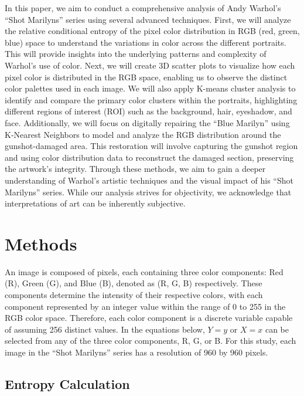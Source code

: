 \documentclass{article}
\begin{document}
In this paper, we aim to conduct a comprehensive analysis of Andy
Warhol's ``Shot Marilyns'' series using several advanced techniques.
First, we will analyze the relative conditional entropy of the pixel
color distribution in RGB (red, green, blue) space to understand the
variations in color across the different portraits. This will provide
insights into the underlying patterns and complexity of Warhol's use of
color. Next, we will create 3D scatter plots to visualize how each pixel
color is distributed in the RGB space, enabling us to observe the
distinct color palettes used in each image. We will also apply K-means
cluster analysis to identify and compare the primary color clusters
within the portraits, highlighting different regions of interest (ROI)
such as the background, hair, eyeshadow, and face. Additionally, we will
focus on digitally repairing the ``Blue Marilyn'' using K-Nearest
Neighbors to model and analyze the RGB distribution around the
gunshot-damaged area. This restoration will involve capturing the
gunshot region and using color distribution data to reconstruct the
damaged section, preserving the artwork's integrity. Through these
methods, we aim to gain a deeper understanding of Warhol's artistic
techniques and the visual impact of his ``Shot Marilyns'' series. While
our analysis strives for objectivity, we acknowledge that
interpretations of art can be inherently subjective.

\hypertarget{methods}{%
\section{Methods}\label{methods}}

An image is composed of pixels, each containing three color components:
Red (R), Green (G), and Blue (B), denoted as (R, G, B) respectively.
These components determine the intensity of their respective colors,
with each component represented by an integer value within the range of
0 to 255 in the RGB color space. Therefore, each color component is a
discrete variable capable of assuming 256 distinct values. In the
equations below, \(Y=y\) or \(X=x\) can be selected from any of the
three color components, R, G, or B. For this study, each image in the
``Shot Marilyns'' series has a resolution of 960 by 960 pixels.

\hypertarget{entropy-calculation}{%
\subsection{Entropy Calculation}\label{entropy-calculation}}
\end{document}
